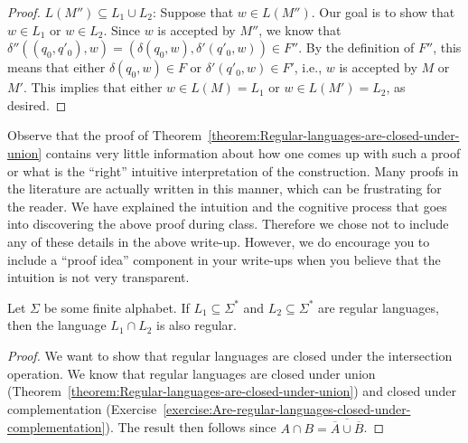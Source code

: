 \begin{flex}
\begin{proof}
$L(M'') \subseteq L_1 \cup L_2$: 
Suppose that $w \in L(M'')$. 
Our goal is to show that $w \in L_1$ or  $w \in L_2$. 
Since $w$ is accepted by $M''$, we know that $\delta''((q_0, q'_0), w) = (\delta(q_0,w), \delta'(q'_0, w)) \in F''$. 
By the definition of $F''$, this means that either $\delta(q_0, w) \in F$ or $\delta'(q'_0, w) \in F'$, i.e., $w$ is accepted by $M$ or $M'$. 
This implies that either $w \in L(M) = L_1$ or $w \in L(M') = L_2$, as desired.  
\end{proof}
\end{flex}


\begin{note} \label{note:On-proof-write-up}
Observe that the proof of Theorem~\ref{theorem:Regular-languages-are-closed-under-union} contains very little information about how one comes up with such a proof or what is the ``right'' intuitive interpretation of the construction. 
Many proofs in the literature are actually written in this manner, which can be frustrating for the reader. 
We have explained the intuition and the cognitive process that goes into discovering the above proof during class. 
Therefore we chose not to include any of these details in the above write-up. 
However, we do encourage you to include a ``proof idea'' component in your write-ups when you believe that the intuition is not very transparent. 
\end{note}


\begin{flex}
\begin{corollary} \label{corollary:Regular-languages-are-closed-under-intersection}
Let $\Sigma$ be some finite alphabet. 
If $L_1 \subseteq \Sigma^*$ and $L_2 \subseteq \Sigma^*$ are regular languages, then the language $L_1 \cap L_2$ is also regular.
\end{corollary}

\begin{proof}
We want to show that regular languages are closed under the intersection operation. We know that regular languages are closed under union (Theorem~\ref{theorem:Regular-languages-are-closed-under-union}) and closed under complementation (Exercise~\ref{exercise:Are-regular-languages-closed-under-complementation}). 
The result then follows since $A \cap B = \overline{\overline{A} \cup \overline{B}}$. 
\end{proof}
\end{flex}


